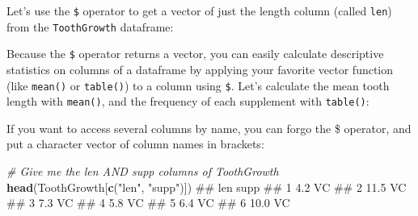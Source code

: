 \documentclass[]{book}
\newenvironment{Shaded}{\begin{snugshade}}{\end{snugshade}}
\newcommand{\KeywordTok}[1]{\textcolor[rgb]{0.13,0.29,0.53}{\textbf{#1}}}
\newcommand{\StringTok}[1]{\textcolor[rgb]{0.31,0.60,0.02}{#1}}
\newcommand{\CommentTok}[1]{\textcolor[rgb]{0.56,0.35,0.01}{\textit{#1}}}
\newcommand{\OperatorTok}[1]{\textcolor[rgb]{0.81,0.36,0.00}{\textbf{#1}}}
\newcommand{\NormalTok}[1]{#1}
\theoremstyle{definition}
\theoremstyle{definition}
\theoremstyle{remark}
\begin{document}
Let's use the \texttt{\$} operator to get a vector of just the length
column (called \texttt{len}) from the \texttt{ToothGrowth} dataframe:

\begin{Shaded}
\end{Shaded}

Because the \texttt{\$} operator returns a vector, you can easily
calculate descriptive statistics on columns of a dataframe by applying
your favorite vector function (like \texttt{mean()} or \texttt{table()})
to a column using \texttt{\$}. Let's calculate the mean tooth length
with \texttt{mean()}, and the frequency of each supplement with
\texttt{table()}:

\begin{Shaded}
\end{Shaded}

If you want to access several columns by name, you can forgo the \$
operator, and put a character vector of column names in brackets:

\begin{Shaded}
\begin{Highlighting}[]
\CommentTok{# Give me the len AND supp columns of ToothGrowth}
\KeywordTok{head}\NormalTok{(ToothGrowth[}\KeywordTok{c}\NormalTok{(}\StringTok{"len"}\NormalTok{, }\StringTok{"supp"}\NormalTok{)])}
\NormalTok{##    len supp}
\NormalTok{## 1  4.2   VC}
\NormalTok{## 2 11.5   VC}
\NormalTok{## 3  7.3   VC}
\NormalTok{## 4  5.8   VC}
\NormalTok{## 5  6.4   VC}
\NormalTok{## 6 10.0   VC}
\end{Highlighting}
\end{Shaded}
\end{document}
